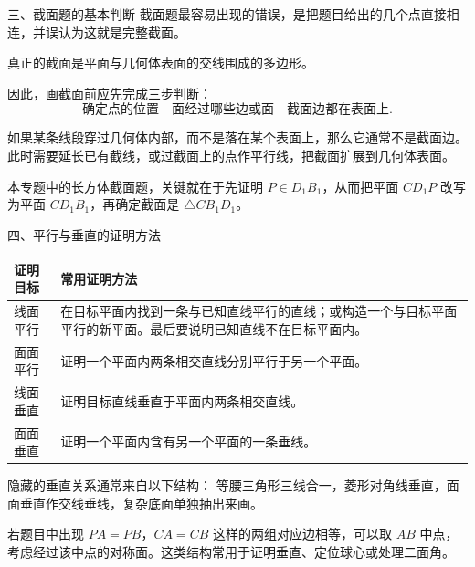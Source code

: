 \documentclass[11pt,a4paper]{ctexart}
\begin{document}
\begin{teachbox}{三、截面题的基本判断}
截面题最容易出现的错误，是把题目给出的几个点直接相连，并误认为这就是完整截面。

真正的截面是平面与几何体表面的交线围成的多边形。

因此，画截面前应先完成三步判断：
\[
  \boxed{\text{确定点的位置}}
  \quad
  \boxed{\text{面经过哪些边或面}}
  \quad
  \boxed{\text{截面边都在表面上}}.
\]

如果某条线段穿过几何体内部，而不是落在某个表面上，那么它通常不是截面边。此时需要延长已有截线，或过截面上的点作平行线，把截面扩展到几何体表面。

本专题中的长方体截面题，关键就在于先证明 \(P\in D_1B_1\)，从而把平面 \(CD_1P\) 改写为平面 \(CD_1B_1\)，再确定截面是 \(\triangle CB_1D_1\)。
\end{teachbox}

\begin{teachbox}{四、平行与垂直的证明方法}
\renewcommand{\arraystretch}{1.35}
\begin{tabularx}{\textwidth}{p{3.0cm}X}
\toprule
证明目标 & 常用证明方法 \\
\midrule
线面平行 & 在目标平面内找到一条与已知直线平行的直线；或构造一个与目标平面平行的新平面。最后要说明已知直线不在目标平面内。\\ \hline
面面平行 & 证明一个平面内两条相交直线分别平行于另一个平面。\\ \hline
线面垂直 & 证明目标直线垂直于平面内两条相交直线。\\ \hline
面面垂直 & 证明一个平面内含有另一个平面的一条垂线。\\
\bottomrule
\end{tabularx}

隐藏的垂直关系通常来自以下结构：
等腰三角形三线合一，菱形对角线垂直，面面垂直作交线垂线，复杂底面单独抽出来画。

若题目中出现 \(PA=PB\)，\(CA=CB\) 这样的两组对应边相等，可以取 \(AB\) 中点，考虑经过该中点的对称面。这类结构常用于证明垂直、定位球心或处理二面角。
\end{teachbox}
\end{document}
